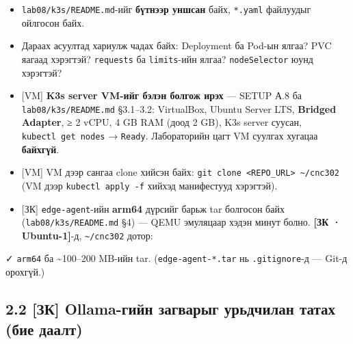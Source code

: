 \begin{itemize}
\tightlist
\item
  \texttt{lab08/\allowbreak{}k3s/\allowbreak{}README.\allowbreak{}md}-ийг \textbf{бүтнээр уншсан} байх, \texttt{*.yaml} файлуудыг ойлгосон байх.
\item
  Дараах асуултад хариулж чадах байх: Deployment ба Pod-ын ялгаа? PVC яагаад хэрэгтэй? \texttt{requests} ба \texttt{limits}-ийн ялгаа? \texttt{nodeSelector} юунд хэрэгтэй?
\item
  {[}VM{]} \textbf{K3s server VM-ийг бэлэн болгож ирэх} --- SETUP А.8 ба \texttt{lab08/\allowbreak{}k3s/\allowbreak{}README.\allowbreak{}md} §3.1--3.2: VirtualBox, Ubuntu Server LTS, \textbf{Bridged Adapter}, ≥ 2 vCPU, 4 GB RAM (доод 2 GB), K3s server суусан, \texttt{kubectl\ get\ nodes} → \texttt{Ready}. Лабораторийн цагт VM суулгах хугацаа \textbf{байхгүй}.
\item
  {[}VM{]} VM дээр сангаа clone хийсэн байх: \texttt{git\ clone\ \textless{}REPO\_URL\textgreater{}\ \textasciitilde{}/cnc302} (VM дээр \texttt{kubectl\ apply\ -f} хийхэд манифестууд хэрэгтэй).
\item
  {[}ЗК{]} \texttt{edge-agent}-ийн \textbf{arm64} дүрсийг барьж tar болгосон байх (\texttt{lab08/\allowbreak{}k3s/\allowbreak{}README.\allowbreak{}md} §4) --- QEMU эмуляцаар хэдэн минут болно. \textbf{{[}ЗК · Ubuntu-1{]}}-д, \texttt{\textasciitilde{}/cnc302} дотор:
\end{itemize}

\begin{Shaded}
\begin{Highlighting}[]
\end{Highlighting}
\end{Shaded}

✓ \texttt{arm64} ба \textasciitilde100--200 MB-ийн tar. (\texttt{edge-agent-*.tar} нь \texttt{.gitignore}-д --- Git-д орохгүй.)

\hypertarget{ux437ux43a-ollama-ux433ux438ux439ux43d-ux437ux430ux433ux432ux430ux440ux44bux433-ux443ux440ux44cux434ux447ux438ux43bux430ux43d-ux442ux430ux442ux430ux445-ux431ux438ux435-ux434ux430ux430ux43bux442}{%
\subsection{2.2 {[}ЗК{]} Ollama-гийн загварыг урьдчилан татах (бие даалт)}\label{ux437ux43a-ollama-ux433ux438ux439ux43d-ux437ux430ux433ux432ux430ux440ux44bux433-ux443ux440ux44cux434ux447ux438ux43bux430ux43d-ux442ux430ux442ux430ux445-ux431ux438ux435-ux434ux430ux430ux43bux442}}

